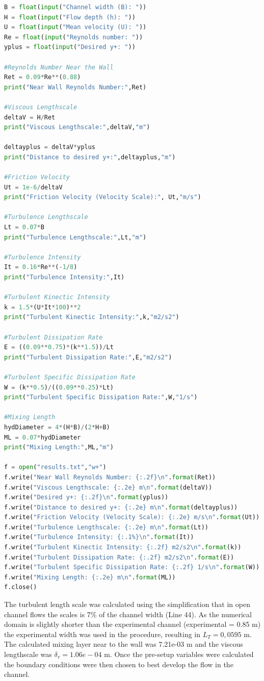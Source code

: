 \documentclass[../main.tex]{subfiles}
\begin{document}
\begin{lstlisting}[language=python]
B = float(input("Channel width (B): "))
H = float(input("Flow depth (h): "))
U = float(input("Mean velocity (U): "))
Re = float(input("Reynolds number: "))
yplus = float(input("Desired y+: "))

#Reynolds Number Near the Wall
Ret = 0.09*Re**(0.88)
print("Near Wall Reynolds Number:",Ret)

#Viscous Lengthscale
deltaV = H/Ret
print("Viscous Lengthscale:",deltaV,"m")

deltayplus = deltaV*yplus
print("Distance to desired y+:",deltayplus,"m")

#Friction Velocity
Ut = 1e-6/deltaV
print("Friction Velocity (Velocity Scale):", Ut,"m/s")

#Turbulence Lengthscale
Lt = 0.07*B
print("Turbulence Lengthscale:",Lt,"m")

#Turbulence Intensity
It = 0.16*Re**(-1/8)
print("Turbulence Intensity:",It)

#Turbulent Kinectic Intensity
k = 1.5*(U*It*100)**2
print("Turbulent Kinectic Intensity:",k,"m2/s2")

#Turbulent Dissipation Rate
E = ((0.09**0.75)*(k**1.5))/Lt
print("Turbulent Dissipation Rate:",E,"m2/s2")

#Turbulent Specific Dissipation Rate
W = (k**0.5)/((0.09**0.25)*Lt)
print("Turbulent Specific Dissipation Rate:",W,"1/s")

#Mixing Length
hydDiameter = 4*(H*B)/(2*H+B)
ML = 0.07*hydDiameter
print("Mixing Length:",ML,"m")

f = open("results.txt","w+")
f.write("Near Wall Reynolds Number: {:.2f}\n".format(Ret))
f.write("Viscous Lengthscale: {:.2e} m\n".format(deltaV))
f.write("Desired y+: {:.2f}\n".format(yplus))
f.write("Distance to desired y+: {:.2e} m\n".format(deltayplus))
f.write("Friction Velocity (Velocity Scale): {:.2e} m/s\n".format(Ut))
f.write("Turbulence Lengthscale: {:.2e} m\n".format(Lt))
f.write("Turbulence Intensity: {:.1%}\n".format(It))
f.write("Turbulent Kinectic Intensity: {:.2f} m2/s2\n".format(k))
f.write("Turbulent Dissipation Rate: {:.2f} m2/s2\n".format(E))
f.write("Turbulent Specific Dissipation Rate: {:.2f} 1/s\n".format(W))
f.write("Mixing Length: {:.2e} m\n".format(ML))
f.close()
\end{lstlisting}

The turbulent length scale was calculated using the simplification that in open channel flows the scales is 7\% of the channel width (Line 44). As the numerical domain is slightly shorter than the experimental channel (experimental = 0.85 m) the experimental width was used in the procedure, resulting in $L_T = 0,0595$ m. The calculated mixing layer near to the wall was 7.21e-03 m and the viscous lengthscale was $\delta_v=1.06e-04$ m. Once the pre-setup variables were calculated the boundary conditions were then chosen to best develop the flow in the channel.
\end{document}
